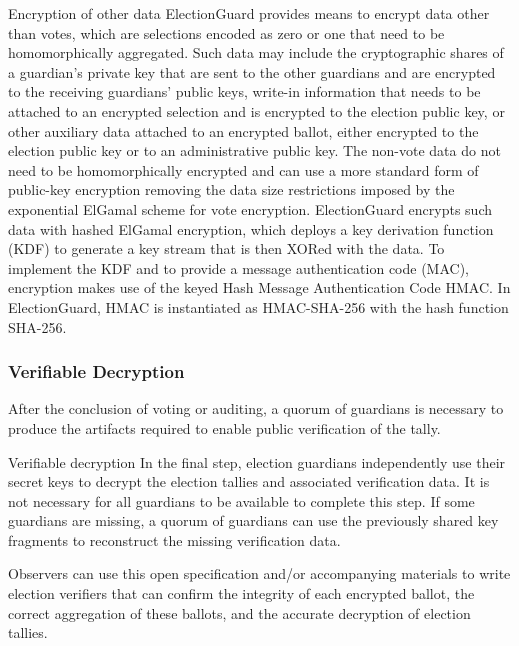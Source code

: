 Encryption of other data ElectionGuard provides means to encrypt data other than votes, which are selections encoded as
zero or one that need to be homomorphically aggregated. Such data may include the cryptographic shares of a guardian’s
private key that are sent to the other guardians and are encrypted to the receiving guardians’ public keys, write-in
information that needs to be attached to an encrypted selection and is encrypted to the election public key, or other
auxiliary data attached to an encrypted ballot, either encrypted to the election public key or to an administrative
public key. The non-vote data do not need to be homomorphically encrypted and can use a more standard form of public-key
encryption removing the data size restrictions imposed by the exponential ElGamal scheme for vote encryption.
ElectionGuard encrypts such data with hashed ElGamal encryption, which deploys a key derivation function (KDF) to
generate a key stream that is then XORed with the data. To implement the KDF and to provide a message authentication
code (MAC), encryption makes use of the keyed Hash Message Authentication Code HMAC. In ElectionGuard, HMAC is
instantiated as HMAC-SHA-256 with the hash function SHA-256.
\cite[7]{eg-spec}

\subsubsection{Verifiable Decryption}
After the conclusion of voting or
auditing, a quorum of guardians is necessary to produce the artifacts required to enable public verification of the
tally. \cite[2]{eg-spec}

Verifiable decryption
In the final step, election guardians independently use their secret keys to decrypt the election tallies and associated
verification data. It is not necessary for all guardians to be available to complete this step. If some guardians are
missing, a quorum of guardians can use the previously shared key fragments to reconstruct the missing verification data.
\cite[3]{eg-spec}

Observers can use this open specification and/or accompanying materials to write election verifiers that can confirm the
integrity of each encrypted ballot, the correct aggregation of these ballots, and the accurate decryption of election
tallies.
\cite[3]{eg-spec}


